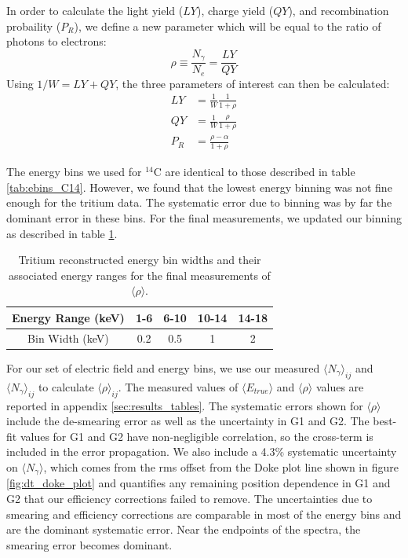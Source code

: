 In order to calculate the light yield ($LY$), charge yield ($QY$), and recombination probaility ($P_R$), we define a new parameter which will be equal to the ratio of photons to electrons:
\begin{equation}
\rho \equiv \frac{N_{\gamma}}{N_e}=\frac{LY}{QY}
\end{equation}
Using $1/W=LY+QY$, the three parameters of interest can then be calculated:
\begin{equation}\label{eq:translate_rho}
\begin{split}
LY&=\frac{1}{W}\frac{1}{1+\rho}\\[1em]
QY&=\frac{1}{W}\frac{\rho}{1+\rho}\\[1em]
P_R&=\frac{\rho-\alpha}{1+\rho}
\end{split}
\end{equation}

The energy bins we used for $^{14}$C are identical to those described in table \ref{tab:ebins_C14}. However, we found that the lowest energy binning was not fine enough for the tritium data. The systematic error due to binning was by far the dominant error in these bins. For the final measurements, we updated our binning as described in table \ref{tab:ebins_h3_new}.
\begin{table}[h!]
\centering
    \begin{tabular}{ c || c | c | c | c  }
    \hline
    Energy Range (keV) & 1-6  & 6-10 & 10-14 & 14-18\\
    \hline
    Bin Width (keV)         &  0.2      &  0.5         & 1           & 2 \\
    \hline
    \end{tabular}
    \caption{Tritium reconstructed energy bin widths and their associated energy ranges for the final measurements of $\langle \rho \rangle$.}
    \label{tab:ebins_h3_new}
\end{table}

For our set of electric field and energy bins, we use our measured $\langle N_{\gamma} \rangle_{ij}$ and $\langle N_{\gamma} \rangle_{ij}$ to calculate $\langle \rho \rangle_{ij}$. The measured values of $\langle E_{true} \rangle$ and $\langle \rho \rangle$ values are reported in appendix \ref{sec:results_tables}. The systematic errors shown for $\langle \rho \rangle$ include the de-smearing error as well as the uncertainty in G1 and G2. The best-fit values for G1 and G2 have non-negligible correlation, so the cross-term is included in the error propagation. We also include a 4.3\% systematic uncertainty on $\langle N_{\gamma} \rangle$, which comes from the rms offset from the Doke plot line shown in figure \ref{fig:dt_doke_plot} and quantifies any remaining position dependence in G1 and G2 that our efficiency corrections failed to remove. The uncertainties due to smearing and efficiency corrections are comparable in most of the energy bins and are the dominant systematic error. Near the endpoints of the spectra, the smearing error becomes dominant.


